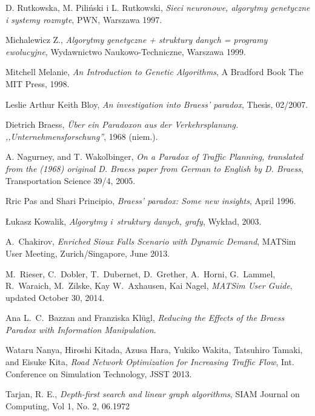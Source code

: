 \documentclass[twoside,12pt]{report}
\renewcommand{\bibname}{Bibliografia}
\begin{document}
\cleardoublepage
{}
\addcontentsline{toc}{chapter}{\bibname} 
\begin{thebibliography}{99}

	D. Rutkowska, M. Piliński i L. Rutkowski,
	\textit{Sieci neuronowe, algorytmy genetyczne i systemy rozmyte},
	PWN, Warszawa 1997.
	
	Michalewicz Z., 
	\textit{Algorytmy genetyczne + struktury danych = programy ewolucyjne}, 
	Wydawnictwo Naukowo-Techniczne, Warszawa 1999.

	Mitchell Melanie,
	\textit{An Introduction to Genetic Algorithms},
	A Bradford Book The MIT Press, 1998.	
	
	Leslie Arthur Keith Bloy, 
	\textit{An investigation into Braess’ paradox}, 
	Thesis, 02/2007.

	Dietrich Braess,
	\textit{Über ein Paradoxon aus der Verkehrsplanung. ,,Unternehmensforschung''},
	1968 (niem.).
	
	A. Nagurney, and T. Wakolbinger,
	\textit{On a Paradox of Traffic Planning, translated from the (1968) original D. Braess paper from German to English by D. Braess},
	Transportation Science 39/4, 2005.

	Rric Pas and Shari Principio,
	\textit{Braess’ paradox: Some new insights}, 
	April 1996.

	Łukasz Kowalik,
	\textit{Algorytmy i~struktury danych, grafy},
	Wykład, 2003.
	
	A.~Chakirov,
	\textit{Enriched Sioux Falls Scenario with Dynamic Demand},
	MATSim User Meeting, Zurich/Singapore, June 2013.
		
	M.~Rieser, C.~Dobler, T.~Dubernet, D.~Grether, A.~Horni, G.~Lammel, R.~Waraich, M.~Zilske, Kay W.~Axhausen, Kai Nagel,
	\textit{MATSim User Guide},
	updated October 30, 2014.

	Ana L.~C.~Bazzan and Franziska Klügl,
	\textit{Reducing the Effects of the Braess Paradox with Information Manipulation}.

	Wataru Nanya, Hiroshi Kitada, Azusa Hara, Yukiko Wakita, Tatsuhiro Tamaki, and Eisuke Kita,
	\textit{Road Network Optimization for Increasing Traffic Flow},
	Int. Conference on Simulation Technology, JSST 2013.

	Tarjan, R. E.,
	\textit{Depth-first search and linear graph algorithms},
	SIAM Journal on Computing, Vol 1, No. 2, 06.1972
	

\end{thebibliography}
\end{document}
